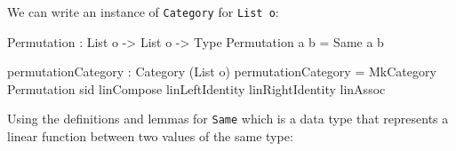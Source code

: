 \documentclass[
]{article}
\newenvironment{Shaded}{}{}
\newcommand{\DataTypeTok}[1]{\textcolor[rgb]{0.56,0.13,0.00}{#1}}
\newcommand{\NormalTok}[1]{#1}
\newcommand{\OperatorTok}[1]{\textcolor[rgb]{0.40,0.40,0.40}{#1}}
\newcommand{\OtherTok}[1]{\textcolor[rgb]{0.00,0.44,0.13}{#1}}
\begin{document}
We can write an instance of \texttt{Category} for \texttt{List\ o}:

\begin{Shaded}
\begin{Highlighting}[]
\DataTypeTok{Permutation} \OperatorTok{:} \DataTypeTok{List}\NormalTok{ o }\OtherTok{{-}\textgreater{}} \DataTypeTok{List}\NormalTok{ o }\OtherTok{{-}\textgreater{}} \DataTypeTok{Type}
\DataTypeTok{Permutation}\NormalTok{ a b }\OtherTok{=} \DataTypeTok{Same}\NormalTok{ a b}

\NormalTok{permutationCategory }\OperatorTok{:} \DataTypeTok{Category}\NormalTok{ (}\DataTypeTok{List}\NormalTok{ o)}
\NormalTok{permutationCategory }\OtherTok{=} \DataTypeTok{MkCategory}
  \DataTypeTok{Permutation}
\NormalTok{  sid}
\NormalTok{  linCompose}
\NormalTok{  linLeftIdentity}
\NormalTok{  linRightIdentity}
\NormalTok{  linAssoc}
\end{Highlighting}
\end{Shaded}

Using the definitions and lemmas for \texttt{Same} which is a data type
that represents a linear function between two values of the same type:
\end{document}

